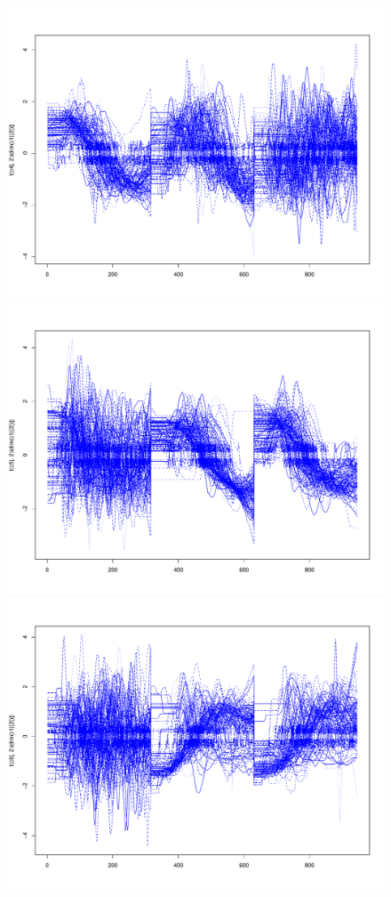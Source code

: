 \begin{figure}
\includegraphics[scale=0.1]{images/c4}
\includegraphics[scale=0.1]{images/c5}
\includegraphics[scale=0.1]{images/c6}

\end{figure}
